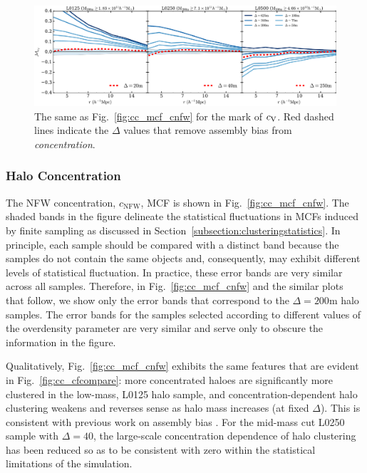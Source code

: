 \documentclass[usenatbib,fleqn]{mnras}
\begin{document}
\begin{figure}
	\centering
	\includegraphics[width=\textwidth]{all_mcf_cV.pdf}
	\caption{	
The same as Fig.~\ref{fig:cc_mcf_cnfw} for the mark of $c_{\rm V}$.
Red dashed lines indicate the $\Delta$ values that remove assembly bias from \emph{concentration}. 
}
	\label{fig:cc_mcf_cV}
\end{figure}

\subsubsection{Halo Concentration}

The NFW concentration, $c_{\mathrm{NFW}}$, MCF is shown in Fig.~\ref{fig:cc_mcf_cnfw}. The shaded bands in the figure delineate the statistical fluctuations in MCFs induced by finite sampling as discussed in Section~\ref{subsection:clusteringstatistics}. In principle, each sample should be compared with a distinct band because the samples do not contain the same objects and, consequently, may exhibit different levels of statistical fluctuation. In practice, these error bands are very similar across all samples. Therefore, in Fig.~\ref{fig:cc_mcf_cnfw} and the similar plots that follow, we show only the error bands that correspond to the $\Delta=200$m halo samples. The error bands for the samples selected according to different values of the overdensity parameter are very similar and serve only to obscure the information in the figure. 

Qualitatively, Fig.~\ref{fig:cc_mcf_cnfw} exhibits the same features that are evident in Fig.~\ref{fig:cc_cfcompare}: more concentrated haloes are significantly more clustered in the low-mass, L0125 halo sample, and concentration-dependent halo clustering weakens and reverses sense as halo mass increases (at fixed $\Delta$). This is consistent with previous work on assembly bias \citep[e.g.,][]{wechsler_etal06,sunayama_etal16}. For the mid-mass cut L0250 sample with $\Delta=40$, the large-scale concentration dependence of halo clustering has been reduced so as to be consistent with zero within the statistical limitations of the simulation. 
\end{document}
